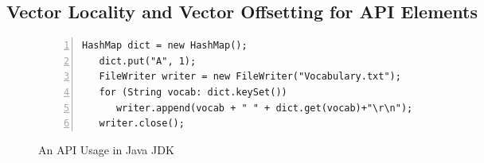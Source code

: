 %				



\subsection{Vector Locality and Vector Offsetting for API Elements}
\label{embedding-study:sec}

\begin{wrapfigure}{l}{0.45 \textwidth}
\scriptsize
\begin{lstlisting}[basicstyle=\scriptsize\sffamily, stepnumber=1, numbers=left, numbersep=-8pt, framexleftmargin=-2mm,
     framexrightmargin=-2mm, emph ={HashMap,FileWriter,String,Integer,for,new,put,keySet,append,get,close}]
   HashMap dict = new HashMap();
   dict.put("A", 1);
   FileWriter writer = new FileWriter("Vocabulary.txt");
   for (String vocab: dict.keySet())
      writer.append(vocab + " " + dict.get(vocab)+"\r\n");
   writer.close();
\end{lstlisting}
\vspace{-0.12in}
\caption{An API Usage in Java JDK}
\label{usageexample}
\vspace{-10pt}
\end{wrapfigure}

